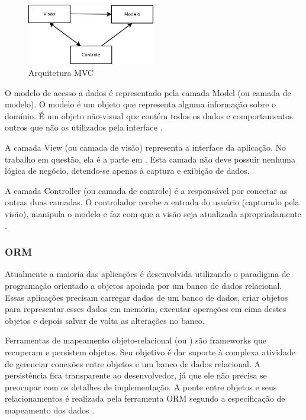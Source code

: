 \begin{figure}[htbp]
\centering
\includegraphics[width=0.5\textwidth]{fig/diagrama_mvc.png}
\caption{Arquitetura MVC}
\label{fig:diag_mvc}
\end{figure}

O modelo de acesso a dados é representado pela camada Model (ou camada de modelo). O modelo 
é um objeto que representa alguma informação sobre o domínio. É um objeto não-visual 
que contém todos os dados e comportamentos outros que não os utilizados 
pela interface \cite{Fowler:2006}.

A camada View (ou camada de visão) representa a interface da aplicação. No trabalho
em questão, ela é a parte em . Esta camada não deve possuir nenhuma lógica de negócio,
detendo-se apenas à captura e exibição de dados.

A camada Controller (ou camada de controle) é a responsável por conectar as outras duas
camadas. O controlador recebe a entrada do usuário (capturado pela visão), manipula o 
modelo e faz com que a visão seja atualizada apropriadamente \cite{Fowler:2006}.

\subsubsection{ORM}
Atualmente a maioria das aplicações é desenvolvida utilizando o paradigma de programação 
orientado a objetos apoiada por um banco de dados relacional. Essas aplicações precisam carregar
dados de um banco de dados, criar objetos para representar esses dados em memória,
executar operações em cima destes objetos e depois salvar de volta as alterações no banco.

Ferramentas de mapeamento objeto-relacional (ou ) são frameworks que recuperam e persistem
objetos. Seu objetivo é dar suporte à complexa atividade de gerenciar conexões entre
objetos e um banco de dados relacional. A persistência fica transparente ao desenvolvedor,
já que ele não precisa se preocupar com os detalhes de implementação. A ponte entre
objetos e seus relacionamentos é realizada pela ferramenta ORM segundo a especificação 
de mapeamento dos dados \cite{springerlink}.


